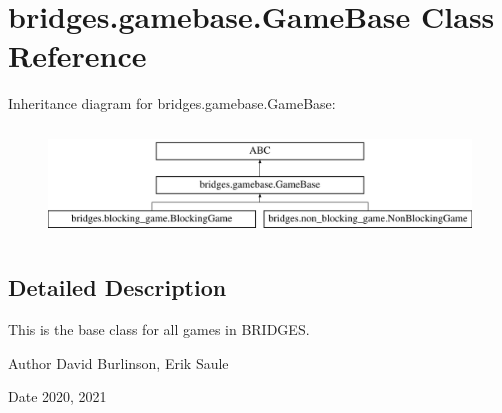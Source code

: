 \hypertarget{classbridges_1_1gamebase_1_1_game_base}{}\section{bridges.\+gamebase.\+Game\+Base Class Reference}
\label{classbridges_1_1gamebase_1_1_game_base}
Inheritance diagram for bridges.\+gamebase.\+Game\+Base\+:\begin{figure}[H]
\begin{center}
\leavevmode
\includegraphics[height=2.947368cm]{classbridges_1_1gamebase_1_1_game_base}
\end{center}
\end{figure}


\subsection{Detailed Description}
This is the base class for all games in B\+R\+I\+D\+G\+ES. 

\begin{DoxyAuthor}{Author}
David Burlinson, Erik Saule 
\end{DoxyAuthor}
\begin{DoxyDate}{Date}
2020, 2021 
\end{DoxyDate}
